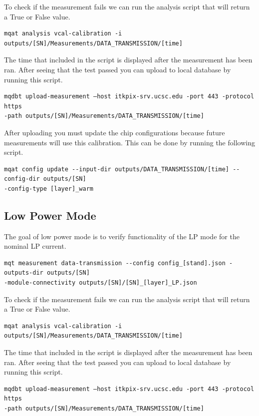 \documentclass[12pt]{article}
\begin{document}
To check if the measurement fails we can run the analysis script that will return a True or False value. 
\begin{verbatim}
mqat analysis vcal-calibration -i outputs/[SN]/Measurements/DATA_TRANSMISSION/[time]
\end{verbatim}

The time that included in the script is displayed after the measurement has been ran. After seeing that the test passed you can upload to local database by running this script. 

\begin{verbatim}
mqdbt upload-measurement –host itkpix-srv.ucsc.edu -port 443 -protocol https
-path outputs/[SN]/Measurements/DATA_TRANSMISSION/[time]
\end{verbatim}
After uploading you must update the chip configurations because future measurements will use this calibration. This can be done by running the following script. 
\begin{verbatim}
mqat config update --input-dir outputs/DATA_TRANSMISSION/[time] --config-dir outputs/[SN] 
-config-type [layer]_warm
\end{verbatim}

\subsection{Low Power Mode}

The goal of low power mode is to verify functionality of the LP mode for the nominal LP current.

\begin{verbatim}
mqt measurement data-transmission --config config_[stand].json -outputs-dir outputs/[SN]
-module-connectivity outputs/[SN]/[SN]_[layer]_LP.json
\end{verbatim}

To check if the measurement fails we can run the analysis script that will return a True or False value. 
\begin{verbatim}
mqat analysis vcal-calibration -i outputs/[SN]/Measurements/DATA_TRANSMISSION/[time]
\end{verbatim}

The time that included in the script is displayed after the measurement has been ran. After seeing that the test passed you can upload to local database by running this script. 

\begin{verbatim}
mqdbt upload-measurement –host itkpix-srv.ucsc.edu -port 443 -protocol https
-path outputs/[SN]/Measurements/DATA_TRANSMISSION/[time]
\end{verbatim}
\end{document}
